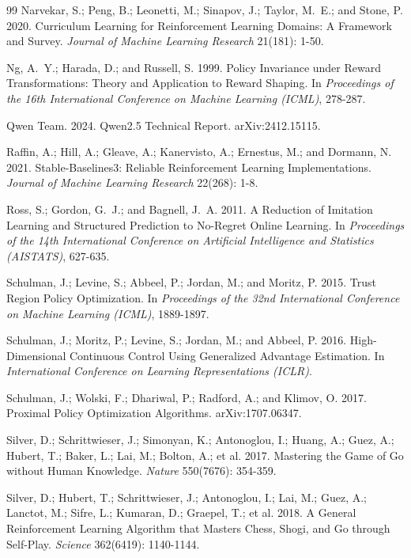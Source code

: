 \documentclass[letterpaper]{article} %
\begin{document}
\begin{thebibliography}{99}
Narvekar, S.; Peng, B.; Leonetti, M.; Sinapov, J.; Taylor, M.~E.; and Stone, P.
2020.
Curriculum Learning for Reinforcement Learning Domains: A Framework and Survey.
\emph{Journal of Machine Learning Research} 21(181): 1-50.

Ng, A.~Y.; Harada, D.; and Russell, S. 1999.
Policy Invariance under Reward Transformations: Theory and Application to Reward
Shaping.
In \emph{Proceedings of the 16th International Conference on Machine Learning
(ICML)}, 278-287.

Qwen Team. 2024.
Qwen2.5 Technical Report.
arXiv:2412.15115.

Raffin, A.; Hill, A.; Gleave, A.; Kanervisto, A.; Ernestus, M.; and Dormann, N.
2021.
Stable-Baselines3: Reliable Reinforcement Learning Implementations.
\emph{Journal of Machine Learning Research} 22(268): 1-8.

Ross, S.; Gordon, G.~J.; and Bagnell, J.~A. 2011.
A Reduction of Imitation Learning and Structured Prediction to No-Regret Online
Learning.
In \emph{Proceedings of the 14th International Conference on Artificial
Intelligence and Statistics (AISTATS)}, 627-635.

Schulman, J.; Levine, S.; Abbeel, P.; Jordan, M.; and Moritz, P. 2015.
Trust Region Policy Optimization.
In \emph{Proceedings of the 32nd International Conference on Machine Learning
(ICML)}, 1889-1897.

Schulman, J.; Moritz, P.; Levine, S.; Jordan, M.; and Abbeel, P. 2016.
High-Dimensional Continuous Control Using Generalized Advantage Estimation.
In \emph{International Conference on Learning Representations (ICLR)}.

Schulman, J.; Wolski, F.; Dhariwal, P.; Radford, A.; and Klimov, O. 2017.
Proximal Policy Optimization Algorithms.
arXiv:1707.06347.

Silver, D.; Schrittwieser, J.; Simonyan, K.; Antonoglou, I.; Huang, A.; Guez, A.;
Hubert, T.; Baker, L.; Lai, M.; Bolton, A.; et al. 2017.
Mastering the Game of Go without Human Knowledge.
\emph{Nature} 550(7676): 354-359.

Silver, D.; Hubert, T.; Schrittwieser, J.; Antonoglou, I.; Lai, M.; Guez, A.;
Lanctot, M.; Sifre, L.; Kumaran, D.; Graepel, T.; et al. 2018.
A General Reinforcement Learning Algorithm that Masters Chess, Shogi, and Go
through Self-Play.
\emph{Science} 362(6419): 1140-1144.


\end{thebibliography}
\end{document}
